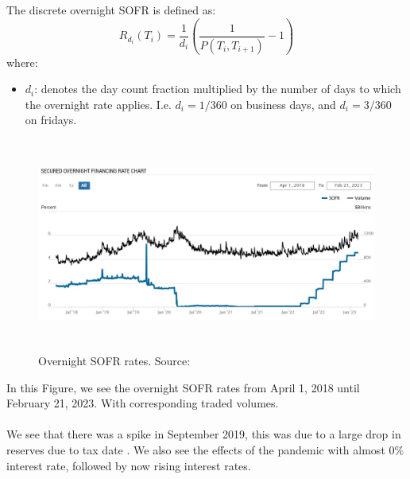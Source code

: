 \newpage 

\begin{definition}
The discrete overnight SOFR is defined as:
\[
R_{d_{i}}(T_{i}) = \frac{1}{d_{i}}\left(
\frac{1}{P(T_{i}, T_{i+1})} - 1
\right)
\]
where:
\begin{itemize}[leftmargin=*]
    \item $d_{i}$: denotes the day count fraction multiplied by the number of days to which the overnight rate applies. I.e. $d_{i} = 1/360$ on business days, and $d_{i} = 3/360$ on fridays. 
\end{itemize}
\end{definition}


\begin{figure}[htp]
    \centering
    \includegraphics[height = 7cm, width=14cm]{figures/SOFR/overnight_SOFR_Volume.JPG}
    \caption{Overnight SOFR rates. Source: \cite{NewYorkFedSOFR}}
    \label{fig: Overnight_SOFR_rates}
\end{figure}

In this Figure, we see the overnight SOFR rates from April 1, 2018 until February 21, 2023. With corresponding traded volumes. 
\\~\\
We see that there was a spike in September 2019, this was due to a large drop in reserves due to tax date \cite{FederalReserve2019}. We also see the effects of the pandemic with almost $0\%$ interest rate, followed by now rising interest rates. 



\newpage 

